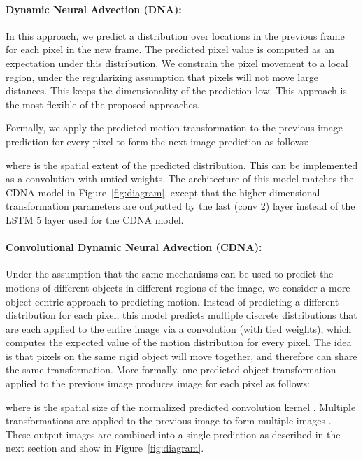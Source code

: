 \documentclass{article}
\begin{document}
\vspace{-0.07in}
\paragraph{Dynamic Neural Advection (DNA):} In this approach, we predict a distribution over locations in the previous frame for each pixel in the
new frame. The predicted pixel value is computed as an expectation under this distribution.
We constrain the pixel movement to a local region, under the regularizing assumption that
pixels will not move large distances. This keeps the dimensionality of the prediction low. This approach is the most flexible of the proposed approaches.

Formally, we apply the predicted motion transformation  to the previous image prediction  for every pixel  to form the next image prediction  as follows:


where  is the spatial extent of the predicted distribution. This can be implemented as a convolution with untied weights.
The architecture of this model matches the CDNA model in Figure~\ref{fig:diagram},
except that the higher-dimensional transformation parameters  are outputted by the last (conv 2) layer instead of the LSTM 5 layer used for the CDNA model.


\vspace{-0.07in}
\paragraph{Convolutional Dynamic Neural Advection (CDNA):} Under the assumption that the same mechanisms can be used to predict the motions of
different objects in different regions of the image, we consider a more object-centric approach to predicting motion.
Instead of predicting a different
distribution for each pixel, this model predicts multiple discrete distributions that are each applied to the entire image via a convolution (with tied weights),
which computes the expected value of the motion distribution for every pixel.
The idea is that pixels on the same rigid object will move together, and therefore
can share the same transformation. More formally, one predicted object transformation  applied to the previous image  produces image  for
each pixel  as follows:

where  is the spatial size of the normalized predicted convolution kernel . Multiple transformations  are applied to the
previous image  to form multiple images .
These output images are combined into a single prediction  as described in the next section and show in Figure~\ref{fig:diagram}.
\end{document}
